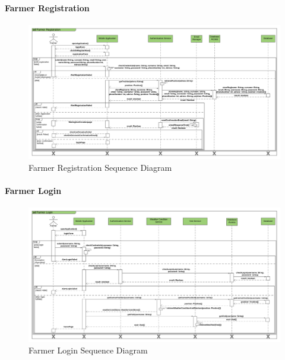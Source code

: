 \paragraph{Farmer Registration}
\begin{center}
\begin{figure}[H]
\centering
    \includegraphics[angle=90,scale= 0.108]{./Images/Farmer Registration Sequence Diagram.png}
    \caption{Farmer Registration Sequence Diagram}
    \label{fig:LandscapeFigure}
\end{figure}
\end{center}

\paragraph{Farmer Login}
\begin{center}
\begin{figure}[H]
\centering
    \includegraphics[angle=90,scale= 0.108]{./Images/Farmer Login Sequence Diagram.png}
    \caption{Farmer Login Sequence Diagram}
    \label{fig:LandscapeFigure}
\end{figure}
\end{center}